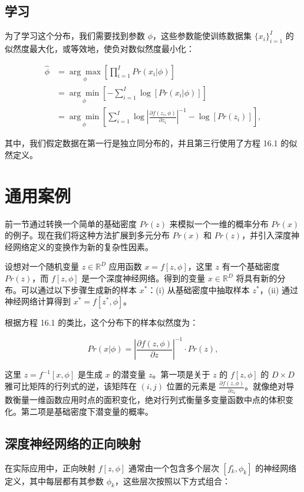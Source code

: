 \subsection{学习}

为了学习这个分布，我们需要找到参数 \(\phi\)，这些参数能使训练数据集 \(\{x_i\}_{i=1}^I\) 的似然度最大化，或等效地，使负对数似然度最小化：


\begin{align}
\hat{\phi} &= \underset{\phi}{\arg\max} \left[ \prod_{i=1}^I Pr(x_i|\phi) \right] \\
&= \underset{\phi}{\arg\min} \left[ -\sum_{i=1}^I \log[Pr(x_i|\phi)] \right] \\
&= \underset{\phi}{\arg\min} \left[ \sum_{i=1}^I \log \left| \frac{\partial f(z_i, \phi)}{\partial z_i} \right|^{-1} - \log[Pr(z_i)] \right], 
\end{align} 


其中，我们假定数据在第一行是独立同分布的，并且第三行使用了方程 16.1 的似然定义。


\section{通用案例}
前一节通过转换一个简单的基础密度 \(Pr(z)\) 来模拟一个一维的概率分布 \(Pr(x)\) 的例子。现在我们将这种方法扩展到多元分布 \(Pr(x)\) 和 \(Pr(z)\)，并引入深度神经网络定义的变换作为新的复杂性因素。

设想对一个随机变量 \(z \in \mathbb{R}^D\) 应用函数 \(x = f[z, \phi]\)，这里 \(z\) 有一个基础密度 \(Pr(z)\)，而 \(f[z, \phi]\) 是一个深度神经网络。得到的变量 \(x \in \mathbb{R}^D\) 将具有新的分布。可以通过以下步骤生成新的样本 \(x^*\)：(i) 从基础密度中抽取样本 \(z^*\)，(ii) 通过神经网络计算得到 \(x^* = f[z^*, \phi]\)。

根据方程 16.1 的类比，这个分布下的样本似然度为：

\begin{equation}
Pr(x|\phi) = \left| \frac{\partial f(z, \phi)}{\partial z} \right|^{-1} \cdot Pr(z), 
\end{equation}

这里 \(z = f^{-1}[x, \phi]\) 是生成 \(x\) 的潜变量 \(z\)。第一项是关于 \(z\) 的 \(f[z, \phi]\) 的 \(D \times D\) 雅可比矩阵的行列式的逆，该矩阵在 \((i, j)\) 位置的元素是 \(\frac{\partial f(z, \phi)}{\partial z_i}\)。就像绝对导数衡量一维函数应用时点的面积变化，绝对行列式衡量多变量函数中点的体积变化。第二项是基础密度下潜变量的概率。

\subsection{深度神经网络的正向映射}
在实际应用中，正向映射 \(f[z, \phi]\) 通常由一个包含多个层次 \([f_k^{\circ}, \phi_k]\) 的神经网络定义，其中每层都有其参数 \(\phi_k\)，这些层次按照以下方式组合：

